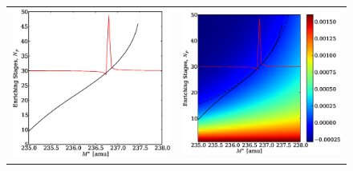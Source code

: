 \documentclass{ansconf}
\begin{document}
\begin{figure}[htpb]
\begin{center}
\begin{tabular}{cc}
\includegraphics[scale=0.375]{np_closed.eps} & 
                                \includegraphics[scale=0.375]{np_closed_overlay.eps} \\

\end{tabular}
\end{center}
\end{figure}
\end{document}
